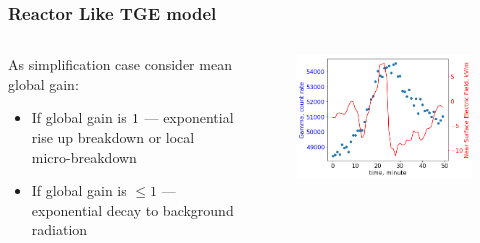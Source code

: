 \documentclass[8pt,pdf,hyperref={unicode}]{beamer}
\begin{document}
\begin{frame}
\begin{figure}

    \end{figure}


\end{frame}

\usebackgroundtemplate{}
\begin{frame}
\frametitle{Reactor Like TGE model}
\begin{columns}
    \begin{column}{0.5\textwidth}
        As simplification case consider mean global gain:
        \begin{itemize}
            \item  If global gain is $\large 1$ --- exponential rise up breakdown or local micro-breakdown
            \item If global gain is $\le 1$ --- exponential decay to background radiation
        \end{itemize}
    \end{column}
    \begin{column}{0.5\textwidth}
        \begin{figure}[htb]
            \centering
            \includegraphics[width=1\columnwidth]{aragats.png}
            \\
        \end{figure}
        
    \end{column}
\end{columns}

\end{frame}
\end{document}
